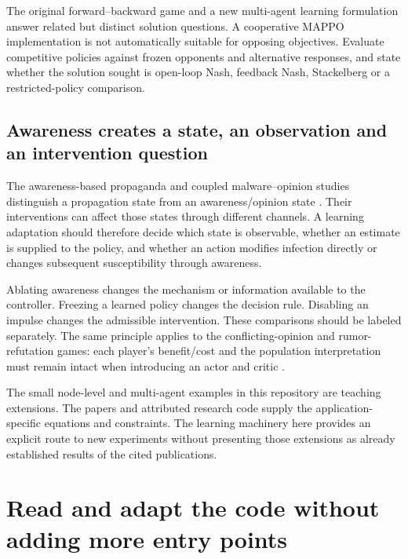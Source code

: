 \documentclass[11pt,a4paper]{article}
\theoremstyle{definition}
\theoremstyle{remark}
\begin{document}
The original forward--backward game and a new multi-agent learning formulation answer related but distinct solution questions. A cooperative MAPPO implementation is not automatically suitable for opposing objectives. Evaluate competitive policies against frozen opponents and alternative responses, and state whether the solution sought is open-loop Nash, feedback Nash, Stackelberg or a restricted-policy comparison.

\subsection{Awareness creates a state, an observation and an intervention question}
The awareness-based propaganda and coupled malware--opinion studies distinguish a propagation state from an awareness/opinion state \cite{awareness2025,malware2025}. Their interventions can affect those states through different channels. A learning adaptation should therefore decide which state is observable, whether an estimate is supplied to the policy, and whether an action modifies infection directly or changes subsequent susceptibility through awareness.

Ablating awareness changes the mechanism or information available to the controller. Freezing a learned policy changes the decision rule. Disabling an impulse changes the admissible intervention. These comparisons should be labeled separately. The same principle applies to the conflicting-opinion and rumor-refutation games: each player's benefit/cost and the population interpretation must remain intact when introducing an actor and critic \cite{opinions2020,rumor2021}.

The small node-level and multi-agent examples in this repository are teaching extensions. The papers and attributed research code supply the application-specific equations and constraints. The learning machinery here provides an explicit route to new experiments without presenting those extensions as already established results of the cited publications.

\section{Read and adapt the code without adding more entry points}
\end{document}
